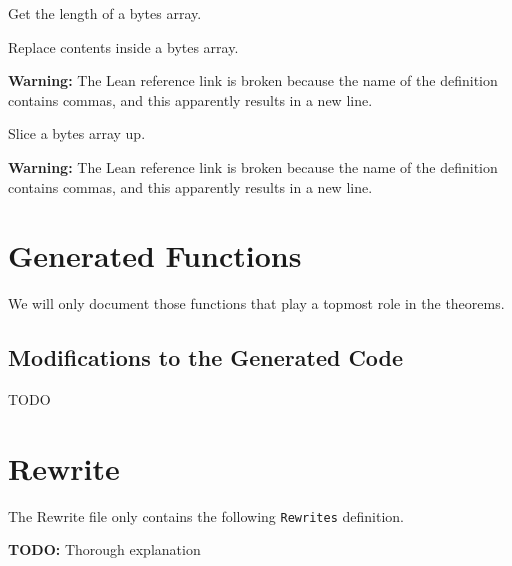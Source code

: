 \begin{definition}[lengthBytes]\label{def:lengthBytes}
\leanok{}
Get the length of a bytes array.
\end{definition}

\begin{definition}[replaceAtBytes]\label{def:replaceAtBytes}
\leanok{}
Replace contents inside a bytes array.

\textbf{Warning:} The Lean reference link is broken because the name of the
definition contains commas, and this apparently results in a new line.
\end{definition}

\begin{definition}[substrBytes]\label{def:substrBytes}
\leanok{}
Slice a bytes array up.

\textbf{Warning:} The Lean reference link is broken because the name of the
definition contains commas, and this apparently results in a new line.
\end{definition}

\section{Generated Functions}

We will only document those functions that play a topmost role in the theorems.

\subsection{Modifications to the Generated Code}

TODO

\section{Rewrite}
The Rewrite file only contains the following \texttt{Rewrites} definition.

\begin{definition}[Rewrites]\label{def:Rewrites}\leanok
\textbf{TODO:} Thorough explanation
\end{definition}
